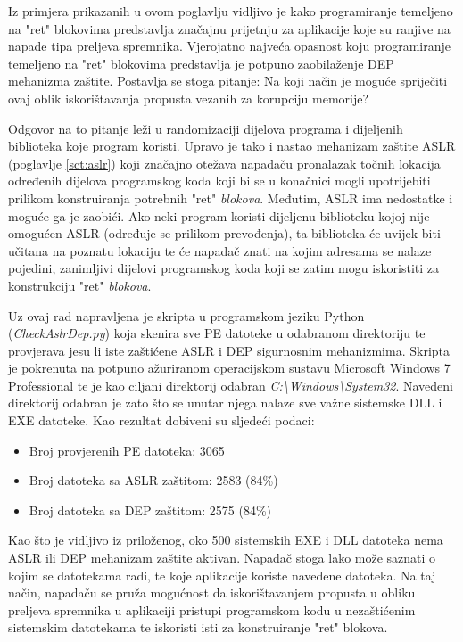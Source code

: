 \documentclass[times, utf8, diplomski, numeric]{fer}
\begin{document}
Iz primjera prikazanih u ovom poglavlju vidljivo je kako programiranje temeljeno na "ret" blokovima predstavlja značajnu prijetnju za aplikacije koje su ranjive na napade tipa preljeva spremnika. Vjerojatno najveća opasnost koju programiranje temeljeno na "ret" blokovima predstavlja je potpuno zaobilaženje DEP mehanizma zaštite. Postavlja se stoga pitanje: Na koji način je moguće spriječiti ovaj oblik iskorištavanja propusta vezanih za korupciju memorije? 

Odgovor na to pitanje leži u randomizaciji dijelova programa i dijeljenih biblioteka koje program koristi. Upravo je tako i nastao mehanizam zaštite ASLR (poglavlje \ref{sct:aslr}) koji značajno otežava napadaču pronalazak točnih lokacija određenih dijelova programskog koda koji bi se u konačnici mogli upotrijebiti prilikom konstruiranja potrebnih "ret" \emph{blokova}. Međutim, ASLR ima nedostatke i moguće ga je zaobići. Ako neki program koristi dijeljenu biblioteku kojoj nije omogućen ASLR (određuje se prilikom prevođenja), ta biblioteka će uvijek biti učitana na poznatu lokaciju te će napadač znati na kojim adresama se nalaze pojedini, zanimljivi dijelovi programskog koda koji se zatim mogu iskoristiti za konstrukciju "ret" \emph{blokova}.

Uz ovaj rad napravljena je skripta u programskom jeziku Python (\emph{CheckAslrDep.py}) koja skenira sve PE datoteke u odabranom direktoriju te provjerava jesu li iste zaštićene ASLR i DEP sigurnosnim mehanizmima. Skripta je pokrenuta na potpuno ažuriranom operacijskom sustavu Microsoft Windows 7 Professional te je kao ciljani direktorij odabran \emph{C:\textbackslash Windows\textbackslash System32}. Navedeni direktorij odabran je zato što se unutar njega nalaze sve važne sistemske DLL i EXE datoteke. Kao rezultat dobiveni su sljedeći podaci:

\begin{itemize}
\item Broj provjerenih PE datoteka: 3065
\item Broj datoteka sa ASLR zaštitom: 2583 (84\%)
\item Broj datoteka sa DEP zaštitom: 2575 (84\%)
\end{itemize}

Kao što je vidljivo iz priloženog, oko 500 sistemskih EXE i DLL datoteka nema ASLR ili DEP mehanizam zaštite aktivan. Napadač stoga lako može saznati o kojim se datotekama radi, te koje aplikacije koriste navedene datoteka. Na taj način, napadaču se pruža mogućnost da iskorištavanjem propusta u obliku preljeva spremnika u aplikaciji pristupi programskom kodu u nezaštićenim sistemskim datotekama te iskoristi isti za konstruiranje "ret" blokova.
\end{document}
